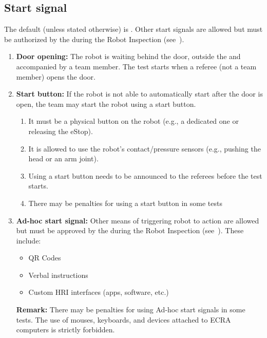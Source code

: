 \subsection{Start signal}
\label{rule:start_signal}
The default  (unless stated otherwise) is .
Other start signals are allowed but must be authorized by the  during the Robot Inspection (see~).

\begin{enumerate}
	\item \textbf{Door opening:} The robot is waiting behind the door, outside the \Arena{} and accompanied by a team member.
	The test starts when a referee (not a team member) opens the door.

	\item \textbf{Start button:} If the robot is not able to automatically start after the door is open, the team may start the robot using a start button.
	\begin{enumerate}[nosep]
		\item It must be a physical button on the robot (e.g., a dedicated one or releasing the eStop).
		\item It is allowed to use the robot's contact/pressure sensors (e.g., pushing the head or an arm joint).
		\item Using a start button needs to be announced to the referees before the test starts.
		\item There may be penalties for using a start button in some tests
	\end{enumerate}

	\item \textbf{Ad-hoc start signal:} Other means of triggering robot to action are allowed but must be approved by the  during the Robot Inspection (see~).
	These include:
	\begin{itemize}[nosep]
		\item QR Codes
		\item Verbal instructions
		\item Custom HRI interfaces (apps, software, etc.)
	\end{itemize}
	\textbf{Remark:} There may be penalties for using Ad-hoc start signals in some tests. The use of mouses, keyboards, and devices attached to ECRA computers is strictly forbidden.

\end{enumerate}



